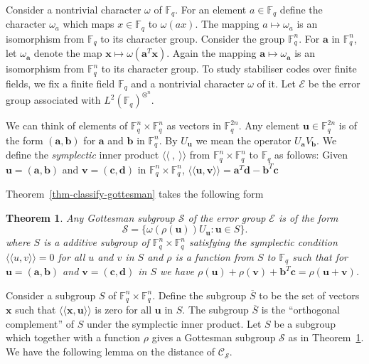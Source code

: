 \documentclass[11pt,twoside]{article}
\newtheorem{theorem}{Theorem}[section]
\theoremstyle{definition}
\theoremstyle{remark}
\newcommand{\LN}[1]{\ensuremath{L^2\left(#1\right)^{\otimes^n}}}
\newcommand{\GF}[0]{\ensuremath{\mathbb{F}}}
\newcommand{\Symp}[2]{\ensuremath{\langle\langle #1, #2 \rangle \rangle}}
\begin{document}
Consider a nontrivial character $\omega$ of $\GF_q$. For an element $a
\in \GF_q$ define the character $\omega_a$ which maps $x \in \GF_q$ to
$\omega(ax)$. The mapping $a \mapsto \omega_a$ is an isomorphism from
$\GF_q$ to its character group. Consider the group $\GF_q^n$. For
$\mathbf{a}$ in $\GF_q^n$, let $\omega_\mathbf{a}$ denote the map
$\mathbf{x} \mapsto \omega(\mathbf{a}^T \mathbf{x})$.  Again the
mapping $\mathbf{a} \mapsto \omega_\mathbf{a}$ is an isomorphism from
$\GF_q^n$ to its character group. To study stabiliser codes over
finite fields, we fix a finite field $\GF_q$ and a nontrivial
character $\omega$ of it. Let $\mathcal{E}$ be the error group
associated with $\LN{\GF_q}$.

We can think of elements of $\GF_q^n \times \GF_q^n$ as vectors in
$\GF_q^{2n}$. Any element $\mathbf{u} \in \GF_q^{2n}$ is of the form
$(\mathbf{a},\mathbf{b})$ for $\mathbf{a}$ and $\mathbf{b}$ in
$\GF_q^n$. By $U_\mathbf{u}$ we mean the operator
$U_\mathbf{a}V_\mathbf{b}$. We define the \emph{symplectic} inner
product $\Symp{\ }{\ }$ {from} $\GF_q^n \times \GF_q^n$ to $\GF_q$ as
follows: Given $\mathbf{u} = (\mathbf{a},\mathbf{b})$ and $\mathbf{v}
= (\mathbf{c},\mathbf{d})$ in $\GF_q^n \times \GF_q^n$,
$\Symp{\mathbf{u}}{\mathbf{v}} = \mathbf{a}^T \mathbf{d} -
\mathbf{b}^T \mathbf{c}$

Theorem~\ref{thm-classify-gottesman} takes the following form

\begin{theorem}\label{thm-gottes-group}
  Any Gottesman subgroup $\mathcal{S}$ of the error group
  $\mathcal{E}$ is of the form
  \[
  \mathcal{S} = \{ \omega(\rho(\mathbf{u})) U_\mathbf{u} : \mathbf{u}
  \in S \}.
  \]
  where $S$ is a additive subgroup of $\GF_q^n \times \GF_q^n$
  satisfying the symplectic condition $\Symp{u}{v} = 0$ for all $u$
  and $v$ in $S$ and $\rho$ is a function from $S$ to $\GF_q$ such
  that for $\mathbf{u} = (\mathbf{a},\mathbf{b})$ and $\mathbf{v} =
  (\mathbf{c},\mathbf{d})$ in $S$ we have $\rho(\mathbf{u}) +
  \rho(\mathbf{v}) + \mathbf{b}^T \mathbf{c} =
  \rho(\mathbf{u}+\mathbf{v})$.
\end{theorem}

Consider a subgroup $S$ of $\GF_q^n \times \GF_q^n$. Define the
subgroup $\overline{S}$ to be the set of vectors $\mathbf{x}$ such
that $\Symp{\mathbf{x}}{\mathbf{u}}$ is zero for all $\mathbf{u}$ in
$S$.  The subgroup $\overline{S}$ is the ``orthogonal complement'' of
$S$ under the symplectic inner product. Let $S$ be a subgroup which
together with a function $\rho$ gives a Gottesman subgroup
$\mathcal{S}$ as in Theorem~\ref{thm-gottes-group}. We have the
following lemma on the distance of $\mathcal{C}_\mathcal{S}$.
\end{document}

